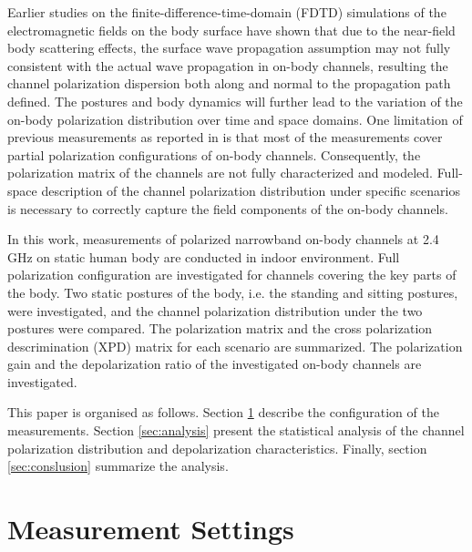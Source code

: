 \documentclass[conference]{IEEEtran}
\begin{document}
Earlier studies on the finite-difference-time-domain (FDTD) simulations of the electromagnetic fields on the body surface \cite{} have shown that due to the near-field body scattering effects, the surface wave propagation assumption may not fully consistent with the actual wave propagation in on-body channels, resulting the channel polarization dispersion both along and normal to the propagation path defined. The postures and body dynamics will further lead to the variation of the on-body polarization distribution over time and space domains. One limitation of previous measurements as reported in \cite{6,7} is that most of the measurements cover partial polarization configurations of on-body channels. Consequently, the polarization matrix of the channels are not fully characterized and modeled. Full-space description of the channel polarization distribution under specific scenarios is necessary to correctly capture the field components of the on-body channels.

In this work, measurements of polarized narrowband on-body channels at 2.4 GHz on static human body are conducted in indoor environment. Full polarization configuration are investigated for channels covering the key parts of the body. Two static postures of the body, i.e. the standing and sitting postures, were investigated, and the channel polarization distribution under the two postures were compared. The polarization matrix and the cross polarization descrimination (XPD) matrix for each scenario are summarized. The polarization gain and the depolarization ratio of the investigated on-body channels are investigated.

This paper is organised as follows. Section \ref{sec:setup} describe the configuration of the measurements. Section \ref{sec:analysis} present the statistical analysis of the channel polarization distribution and depolarization characteristics. Finally, section \ref{sec:conslusion} summarize the analysis.

\section{Measurement Settings}\label{sec:setup}
\end{document}
